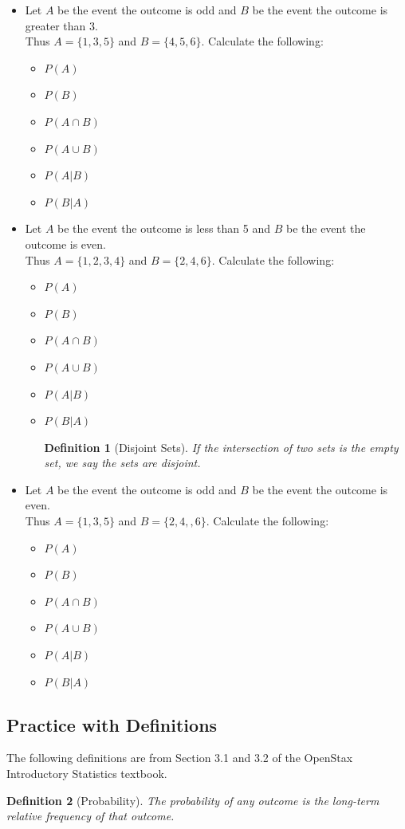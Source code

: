\documentclass{article}
\theoremstyle{plain}
\theoremstyle{box}
\newtheorem*{definition*}{Definition}
\begin{document}
\begin{itemize}
\item Let $A$ be the event the outcome is odd and $B$ be the event the outcome is greater than 3.\\
Thus $A = \{1,3,5\}$ and $B = \{4,5,6\}$. Calculate the following:
\begin{itemize}
\item $P(A)$
\item $P(B)$
\item $P(A \cap B)$
\item $P(A \cup B)$
\item $P(A|B)$
\item $P(B|A)$
\end{itemize}

\item Let $A$ be the event the outcome is less than 5 and $B$ be the event the outcome is even.\\
Thus $A = \{1,2,3,4\}$ and $B = \{2,4,6\}$. Calculate the following:
\begin{itemize}
\item $P(A)$
\item $P(B)$
\item $P(A \cap B)$
\item $P(A \cup B)$
\item $P(A|B)$
\item $P(B|A)$
\begin{definition*}[Disjoint Sets]
If the intersection of two sets is the empty set, we say the sets are disjoint.
\end{definition*}
\end{itemize}

\item Let $A$ be the event the outcome is odd and $B$ be the event the outcome is even.\\
Thus $A = \{1,3,5\}$ and $B = \{2,4,,6\}$. Calculate the following:
\begin{itemize}
\item $P(A)$
\item $P(B)$
\item $P(A \cap B)$
\item $P(A \cup B)$
\item $P(A|B)$
\item $P(B|A)$
\end{itemize}
\end{itemize}



\newpage
\subsection{Practice with Definitions}
The following definitions are from Section 3.1 and 3.2 of the OpenStax Introductory Statistics textbook.
\begin{definition*}[Probability]
The probability of any outcome is the long-term relative frequency of that outcome.
\end{definition*}
\end{document}

